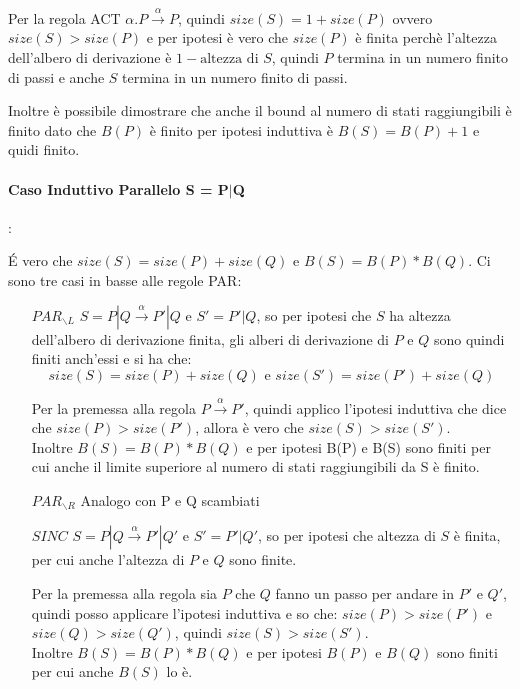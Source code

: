 \documentclass{article}
\newcommand{\passo}{\xrightarrow{\alpha}}
\begin{document}
Per la regola ACT $\alpha.P \xrightarrow{\alpha}P$, quindi  $size(S) = 1+ size(P)$ ovvero $size(S)>size(P)$ e per ipotesi è vero che $size(P)$ è finita perchè l'altezza dell'albero di derivazione è $1- \text{altezza di } S$, quindi $P$ termina in un numero finito di passi e anche $S$ termina in un numero finito di passi.


Inoltre è possibile dimostrare che anche il bound al numero di stati raggiungibili è finito dato che $B(P)$ è finito per ipotesi induttiva è $B(S) = B(P)+1$ e quidi finito.

\paragraph{Caso Induttivo Parallelo S = P$|$Q}:

É vero che 
$size(S) = size(P) + size(Q) $ e $B(S) = B(P) * B(Q)$. Ci sono tre casi in basse alle regole PAR:

\begin{itemize}
    \item[$PAR_{\backslash L}$] $S = P|Q \xrightarrow{\alpha} P'|Q$ e $S'=P'|Q$, so per ipotesi che $S$ ha altezza dell'albero di derivazione finita, gli alberi di derivazione di $P$ e $Q$ sono quindi finiti anch'essi e si ha che: 
    $$size(S)=size(P)+size(Q) \text{ e } size(S')=size(P')+size(Q)$$

Per la premessa alla regola $P \passo P'$, quindi applico l'ipotesi induttiva che dice che $size(P)>size(P')$, allora è vero che $size(S)>size(S')$.  \\   
        
        
Inoltre $B(S) = B(P)*B(Q)$  e per ipotesi B(P) e B(S) sono finiti per cui anche il limite superiore al numero di stati raggiungibili da S è finito.
    
     \item[$PAR_{\backslash R}$] Analogo con P e Q scambiati
     
     \item[$SINC$] $S = P|Q \xrightarrow{\alpha} P'|Q'$ e $S'=P'|Q'$, so per ipotesi che altezza di $S$ è finita, per cui anche l'altezza di $P$ e $Q$ sono finite. 
     
Per la premessa alla regola sia $P$ che $Q$ fanno un passo per andare in $P'$ e $Q'$, quindi posso applicare l'ipotesi induttiva e so che: $ size(P)>size(P')$ e $size(Q)>size(Q')$, quindi $size(S)>size(S')$.\\ 
     
     Inoltre $B(S) = B(P) * B(Q)$ e per ipotesi $B(P)$ e $B(Q)$ sono finiti per cui anche $B(S)$ lo è.
\end{itemize}
\end{document}
